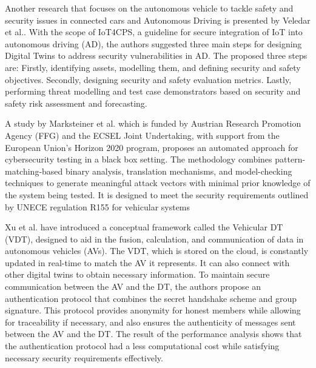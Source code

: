 Another research that focuses on the autonomous vehicle to tackle safety and security issues in connected cars and Autonomous Driving is presented by Veledar et al.\cite{veledarDigitalTwinsDependability2019}.
With the scope of IoT4CPS, a guideline for secure integration of IoT into autonomous driving (AD), the authors suggested three main steps for designing Digital Twins to address security vulnerabilities in AD. The proposed three steps are: Firstly, identifying assets, modelling them, and defining security and safety objectives. Secondly, designing security and safety evaluation metrics. Lastly, performing threat modelling and test case demonstrators based on security and safety risk assessment and forecasting.

A study by Marksteiner et al. \cite{marksteinerUsingCyberDigital2021} which is funded by Austrian Research Promotion Agency (FFG) and the ECSEL Joint Undertaking, with support from the European Union's Horizon 2020 program, proposes an automated approach for cybersecurity testing in a black box setting. The methodology combines pattern-matching-based binary analysis, translation mechanisms, and model-checking techniques to generate meaningful attack vectors with minimal prior knowledge of the system being tested. It is designed to meet the security requirements outlined by UNECE regulation R155 for vehicular systems  

Xu et al.\cite{xuEfficientAuthenticationVehicular2021} have introduced a conceptual framework called the Vehicular DT (VDT), designed to aid in the fusion, calculation, and communication of data in autonomous vehicles (AVs). The VDT, which is stored on the cloud, is constantly updated in real-time to match the AV it represents. It can also connect with other digital twins to obtain necessary information. To maintain secure communication between the AV and the DT, the authors propose an authentication protocol that combines the secret handshake scheme and group signature. This protocol provides anonymity for honest members while allowing for traceability if necessary, and also ensures the authenticity of messages sent between the AV and the DT. The result of the performance analysis shows that the authentication protocol had a less computational cost while satisfying necessary security requirements effectively. 


